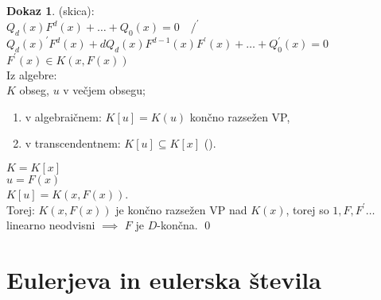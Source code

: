 \documentclass[a4paper, 12pt]{book}
\theoremstyle{definition}
\newtheorem{pro}[counter]{Dokaz}
\theoremstyle{remark}
\begin{document}
\begin{pro} (skica): \\
  $Q_d(x) F^d(x) + \dots + Q_0(x) = 0 \quad /^{'}$ \\
  $Q_d(x)^{'} F^d(x) + d Q_d(x) F^{d-1}(x) F^{'}(x) + \dots + Q_0^{'}(x) = 0$ \\
  $F^{'}(x) \in K(x, F(x))$ \\
  Iz algebre: \\
  $K$ obseg, $u$ v večjem obsegu;
  \begin{enumerate}[label={(\roman*)}]
    \item v algebraičnem: $K[u] = K(u)$ končno razsežen VP,
    \item v transcendentnem: $K[u] \subseteq K[x]$ ().
  \end{enumerate}
  $K = K[x]$ \\
  $u = F(x)$ \\
  $K[u] = K(x, F(x))$. \\
  Torej: $K(x, F(x))$ je končno razsežen VP nad $K(x)$, torej so $1, F, F^{'} \dots$ linearno neodvisni
  $\implies$ $F$ je $D$-končna.
  \qed
\end{pro}


\section{Eulerjeva in eulerska števila}
\end{document}
